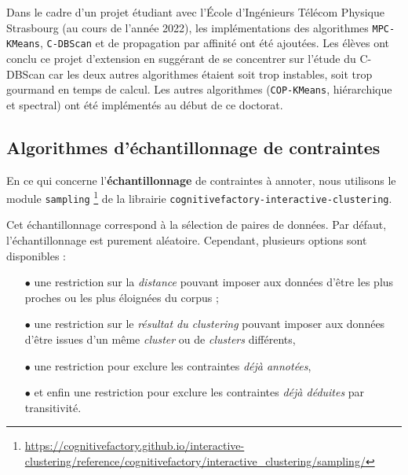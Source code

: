 	\begin{leftBarInformation}
		Dans le cadre d'un projet étudiant avec l'École d'Ingénieurs Télécom Physique Strasbourg (au cours de l'année 2022), les implémentations des algorithmes \texttt{MPC-KMeans}, \texttt{C-DBScan} et de propagation par affinité ont été ajoutées. Les élèves ont conclu ce projet d'extension en suggérant de se concentrer sur l'étude du C-DBScan car les deux autres algorithmes étaient soit trop instables, soit trop gourmand en temps de calcul.
		Les autres algorithmes (\texttt{COP-KMeans}, hiérarchique et spectral) ont été implémentés au début de ce doctorat.
	\end{leftBarInformation}
	
	
	\subsection{Algorithmes d'échantillonnage de contraintes}
	\label{annex:C.1.4-DESCRIPTION-IMPLEMENTATION-INTERACTIVE-CLUSTERING-ALGORITHMES-ECHANTILLONNAGE-DE-CONTRAINTES}
	
	En ce qui concerne l'\textbf{échantillonnage} de contraintes à annoter, nous utilisons le module \texttt{sampling} \footnote{
		\url{https://cognitivefactory.github.io/interactive-clustering/reference/cognitivefactory/interactive_clustering/sampling/}
	} de la librairie \texttt{cognitivefactory-interactive-clustering}.
	
	Cet échantillonnage correspond à la sélection de paires de données.
	Par défaut, l'échantillonnage est purement aléatoire.
	Cependant, plusieurs options sont disponibles :
	
	\begin{itemize}
		\item[\(\bullet\)] une restriction sur la \textit{distance} pouvant imposer aux données d'être les plus proches ou les plus éloignées du corpus ;
		\item[\(\bullet\)] une restriction sur le \textit{résultat du clustering} pouvant imposer aux données d'être issues d'un même \textit{cluster} ou de \textit{clusters} différents,
		\item[\(\bullet\)] une restriction pour exclure les contraintes \textit{déjà annotées},
		\item[\(\bullet\)] et enfin une restriction pour exclure les contraintes \textit{déjà déduites} par transitivité.
	\end{itemize}
	
